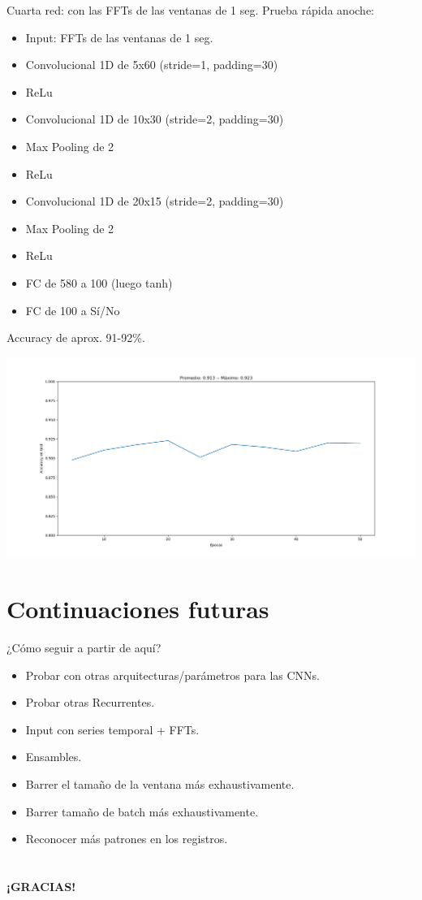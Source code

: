 \documentclass[presentation,9pt]{beamer}
\begin{document}
\begin{frame}{Cuarta red: con las FFTs de las ventanas de 1 seg.}
	Prueba rápida anoche:
		\begin{itemize}
			\item Input: FFTs de las ventanas de 1 seg.%
			\item Convolucional 1D de 5x60 (stride=1, padding=30)
			\item ReLu
			\item Convolucional 1D de 10x30 (stride=2, padding=30)
			\item Max Pooling de 2
			\item ReLu 
			\item Convolucional 1D de 20x15 (stride=2, padding=30)
			\item Max Pooling de 2
			\item ReLu
			\item FC de 580 a 100 (luego tanh)
			\item FC de 100 a Sí/No
		\end{itemize}
	
	Accuracy de aprox. 91-92\%.
	
	\includegraphics[width=.8\textwidth]{./cnn_v7_1seg_normalizado_fft_b1000.png}
	
	
\end{frame}




\section{Continuaciones futuras}

\begin{frame}{¿Cómo seguir a partir de aquí?}
	
	\begin{itemize}
		\item Probar con otras arquitecturas/parámetros para las CNNs.
		\item Probar otras Recurrentes.
		\item Input con series temporal + FFTs.
		\item Ensambles.
		\item Barrer el tamaño de la ventana más exhaustivamente.
		\item Barrer tamaño de batch más exhaustivamente.
		\item Reconocer más patrones en los registros.
	\end{itemize}
\end{frame}


	
	
\section{}
\begin{frame}
	\textbf{\centering\LARGE{¡GRACIAS!}}
\end{frame}
\end{document}

